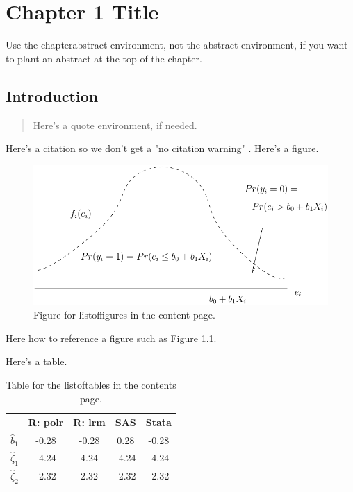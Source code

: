 \chapter{Chapter 1 Title}

\begin{chapterabstract}
    Use the chapterabstract environment, not the abstract environment, if you want to plant an abstract at the top of the chapter.
\end{chapterabstract}

\section{Introduction}

\begin{quote}
   Here's a quote environment, if needed.
\end{quote}
Here's a citation so we don't get a "no citation warning" \cite{GolV13}.
Here's a figure.
\begin{figure}
    \begin{centering}
        \includegraphics[scale=0.8]{chap_1/chap_1_figures/example_1.pdf}
    \par\end{centering}
    \caption{Figure for listoffigures  in the content page.}
    \label{fig:first_fig}
\end{figure}
Here how to reference a figure such as Figure \ref{fig:first_fig}.
\newpage



Here's a table.
\begin{table}
    \centering{}
    \begin{tabular}{|c|c|c|c|c|}
        \hline
            & R: polr & R: lrm & SAS & Stata\tabularnewline
        \hline
        \hline
        $\hat{b}_{1}$ & -0.28 & -0.28 & 0.28 & -0.28\tabularnewline
        \hline
        $\hat{\zeta}_{1}$ & -4.24 & 4.24 & -4.24 & -4.24\tabularnewline
        \hline
        $\hat{\zeta}_{2}$ & -2.32 & 2.32 & -2.32 & -2.32\tabularnewline
        \hline
    \end{tabular}
    \caption{Table for the listoftables in the contents page.}
    \label{tab:random_table}
\end{table}
